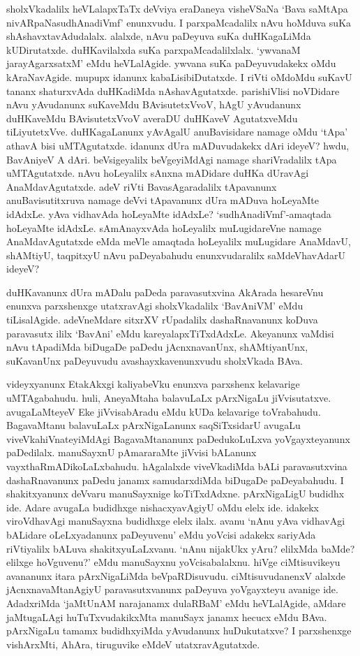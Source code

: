 sholxVkadalilx heVLalapxTaTx deVviya eraDaneya visheVSaNa `Bava saMtApa nivARpaNasudhAnadiVmf' enunxvudu. I parxpaMcadalilx 
nAvu hoMduva suKa shAshavxtavAdudalalx. alalxde, nAvu paDeyuva suKa duHKagaLiMda kUDirutatxde. duHKavilalxda 
suKa parxpaMcadalilxlalx. `ywvanaM jarayAgarxsatxM' eMdu heVLalAgide. ywvana suKa paDeyuvudakekx oMdu 
kAraNavAgide. mupupx idanunx kabaLisibiDutatxde. I riVti oMdoMdu suKavU tananx shaturxvAda duHKadiMda 
nAshavAgutatxde. parishiVlisi noVDidare nAvu yAvudanunx suKaveMdu BAvisutetxVvoV,  
hAgU yAvudanunx duHKaveMdu BAvisutetxVvoV averaDU duHKaveV AgutatxveMdu tiLiyutetxVve. duHKagaLanunx 
yAvAgalU anuBavisidare namage oMdu `tApa' athavA bisi uMTAgutatxde. idanunx dUra 
mADuvudakekx dAri ideyeV? hwdu, BavAniyeV A dAri. beVsigeyalilx beVgeyiMdAgi 
namage shariVradalilx tApa uMTAgutatxde. nAvu hoLeyalilx sAnxna mADidare duHKa dUravAgi 
AnaMdavAgutatxde. adeV riVti BavasAgaradalilx tApavanunx anuBavisutitxruva namage deVvi 
tApavanunx dUra mADuva hoLeyaMte idAdxLe. yAva vidhavAda hoLeyaMte idAdxLe? 
`sudhAnadiVmf'-amaqtada hoLeyaMte idAdxLe. sAmAnayxvAda hoLeyalilx muLugidareVne 
namage AnaMdavAgutatxde eMda meVle amaqtada hoLeyalilx muLugidare AnaMdavU, shAMtiyU, 
taqpitxyU nAvu paDeyabahudu enunxvudaralilx saMdeVhavAdarU ideyeV?

duHKavanunx dUra mADalu paDeda paravasutxvina AkArada hesareVnu enunxva parxshenxge utatxravAgi sholxVkadalilx 
`BavAniVM' eMdu tiLisalAgide. adeVneMdare sitxrXV rUpadalilx dashaRnavanunx koDuva paravasutx ililx `BavAni' eMdu 
kareyalapxTiTxdAdxLe. 
Akeyanunx vaMdisi nAvu tApadiMda biDugaDe paDedu jAcnxnavanUnx, shAMtiyanUnx, suKavanUnx paDeyuvudu avashayxkavenunxvudu sholxVkada BAva.

videyxyanunx EtakAkxgi kaliyabeVku enunxva parxshenx kelavarige uMTAga\-bahudu. huli, AneyaMtaha balavuLaLx pArxNigaLu jiVvisutatxve. avugaLaMteyeV 
Eke jiVvisabAradu eMdu kUDa kelavarige toVrabahudu. BagavaMtanu balavuLaLx pArxNigaLanunx saqSiTxsidarU avugaLu viveVkahiVnateyiMdAgi 
BagavaMtananunx paDedukoLuLxva yoVgayxteyanunx paDedilalx. manuSayxnU pAmararaMte jiVvisi bALanunx vayxthaRmADikoLaLxbahudu. 
hAgalalxde viveVkadiMda bALi paravasutxvina dashaRnavanunx paDedu janamx samudarxdiMda biDugaDe paDeyabahudu. I shakitxyanunx deVvaru 
manuSayxnige koTiTxdAdxne. pArxNigaLigU budidhx ide. Adare avugaLa budidhxge nishacxyavAgiyU oMdu elelx ide. idakekx viroVdhavAgi 
manuSayxna budidhxge elelx ilalx. avanu `nAnu yAva vidhavAgi bALidare oLeLxyadanunx paDeyuvenu' eMdu yoVcisi adakekx sariyAda 
riVtiyalilx bALuva shakitxyuLaLxvanu. `nAnu nijakUkx yAru? elilxMda baMde? elilxge hoVguvenu?' eMdu manuSayxnu yoVcisabalalxnu. 
hiVge ciMtisuvikeyu avananunx itara pArxNigaLiMda beVpaRDisuvudu. ciMtisuvudanenxV alalxde jAcnxnavaMtanAgiyU paravasutxvanunx paDeyuva 
yoVgayxteyu avanige ide. AdadxriMda `jaMtUnAM narajanamx dulaRBaM' eMdu heVLalAgide, aMdare jaMtugaLAgi huTuTxvudakikxMta manuSayx 
janamx hecucx eMdu BAva. pArxNigaLu tamamx budidhxyiMda yAvudanunx huDukutatxve? I parxshenxge vishArxMti, AhAra, tiruguvike eMdeV utatxravAgutatxde.

